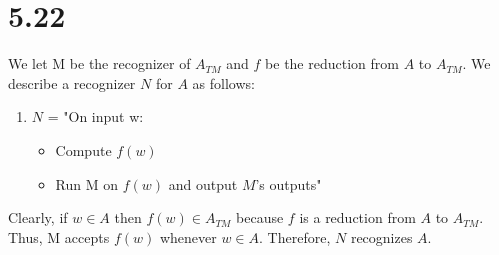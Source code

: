 \documentclass{article}
\begin{document}
\section*{5.22}

We let M be the recognizer of $A_{TM}$ and $f$ be the reduction from $A$ to $A_{TM}$. We describe a recognizer $N$ for $A$ as follows:
\begin{enumerate}
    \item $N$ = "On input w: 
    \begin{itemize}
        \item Compute $f(w)$
        \item Run M on $f(w)$ and output $M$'s outputs"
    \end{itemize}
\end{enumerate}

Clearly, if $w \in A$ then $f(w) \in A_{TM}$ because $f$ is a reduction from $A$ to $A_{TM}$. Thus, M accepts $f(w)$ whenever $w \in A$. Therefore, $N$ recognizes $A$.
\end{document}

